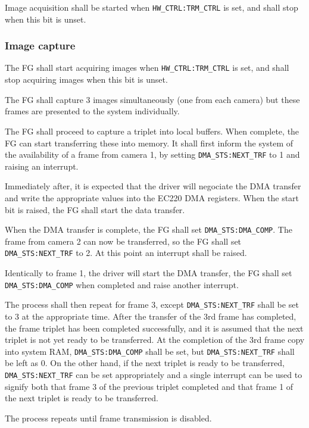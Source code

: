 \documentclass[12pt]{article}
\begin{document}
Image acquisition shall be started when \texttt{HW\_CTRL:TRM\_CTRL} is set, and shall stop when this bit is unset.

\subsubsection{Image capture}

The FG shall start acquiring images when \texttt{HW\_CTRL:TRM\_CTRL} is set, and shall stop acquiring images when this bit is unset.

The FG shall capture 3 images simultaneously (one from each camera) but these frames are presented to the system individually.

The FG shall proceed to capture a triplet into local buffers. When complete, the FG can start transferring these into memory. It shall first inform the system of the availability of a frame from camera 1, by setting \texttt{DMA\_STS:NEXT\_TRF} to 1 and raising an interrupt.

Immediately after, it is expected that the driver will negociate the DMA transfer and write the appropriate values into the EC220 DMA registers. When the start bit is raised, the FG shall start the data transfer.

When the DMA transfer is complete, the FG shall set \texttt{DMA\_STS:DMA\_COMP}. The frame from camera 2 can now be transferred, so the FG shall set \texttt{DMA\_STS:NEXT\_TRF} to 2. At this point an interrupt shall be raised.

Identically to frame 1, the driver will start the DMA transfer, the FG shall set \texttt{DMA\_STS:DMA\_COMP} when completed and raise another interrupt.

The process shall then repeat for frame 3, except \texttt{DMA\_STS:NEXT\_TRF} shall be set to 3 at the appropriate time. After the transfer of the 3rd frame has completed, the frame triplet has been completed successfully, and it is assumed that the next triplet is not yet ready to be transferred. At the completion of the 3rd frame copy into system RAM, \texttt{DMA\_STS:DMA\_COMP} shall be set, but \texttt{DMA\_STS:NEXT\_TRF} shall be left as 0. On the other hand, if the next triplet is ready to be transferred, \texttt{DMA\_STS:NEXT\_TRF} can be set appropriately and a single interrupt can be used to signify both that frame 3 of the previous triplet completed and that frame 1 of the next triplet is ready to be transferred.

The process repeats until frame transmission is disabled.
\end{document}
